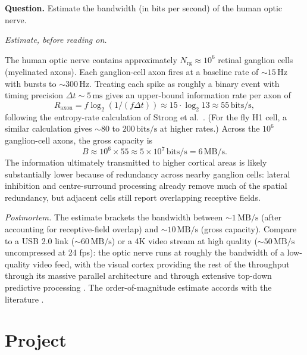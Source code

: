 \begin{estimation}
\textbf{Question.} Estimate the bandwidth (in bits per second) of the
human optic nerve.

\smallskip
\textit{Estimate, before reading on.}

\smallskip
The human optic nerve contains approximately $N_{\text{rg}} \approx
10^6$ retinal ganglion cells (myelinated axons). Each ganglion-cell
axon fires at a baseline rate of $\sim 15\,\text{Hz}$ with bursts
to $\sim 300\,\text{Hz}$. Treating each spike as roughly a binary
event with timing precision $\Delta t \sim 5\,\text{ms}$ gives an
upper-bound information rate per axon of
\[
R_{\text{axon}} = f \log_2 (1/(f \Delta t)) \approx 15 \cdot \log_2 13 \approx 55\,\text{bits/s},
\]
following the entropy-rate calculation of Strong et al.\
\cite{paper:v6c07-strong-1998}. (For the fly H1 cell, a similar
calculation gives $\sim 80$ to $200\,\text{bits/s}$ at higher rates.)
Across the $10^6$ ganglion-cell axons, the gross capacity is
\[
B \approx 10^6 \times 55 \approx 5 \times 10^7\,\text{bits/s} = 6\,\text{MB/s}.
\]
The information ultimately transmitted to higher cortical areas is
likely substantially lower because of redundancy across nearby
ganglion cells: lateral inhibition and centre-surround processing
already remove much of the spatial redundancy, but adjacent cells
still report overlapping receptive fields.

\smallskip
\textit{Postmortem.} The estimate brackets the bandwidth between
$\sim 1\,\text{MB/s}$ (after accounting for receptive-field overlap)
and $\sim 10\,\text{MB/s}$ (gross capacity). Compare to a USB 2.0 link
($\sim 60\,\text{MB/s}$) or a 4K video stream at high quality
($\sim 50\,\text{MB/s}$ uncompressed at 24 fps): the optic nerve runs
at roughly the bandwidth of a low-quality video feed, with the visual
cortex providing the rest of the throughput through its massive
parallel architecture and through extensive top-down predictive
processing \cite{paper:v6c07-friston-2010}. The order-of-magnitude
estimate accords with the literature
\cite[ch.~25]{text:v6c07-kandel-principles-2021}.
\end{estimation}

\section{Project}

